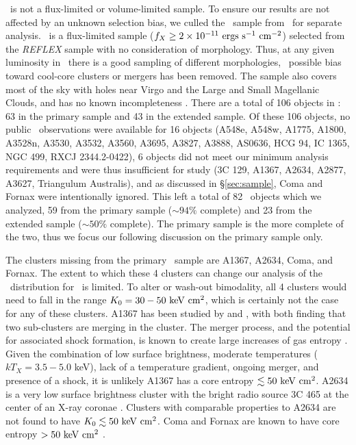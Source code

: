 \documentclass[12pt,preprint]{aastex}
\begin{document}
\accept\ is not a flux-limited or volume-limited sample. To ensure our
results are not affected by an unknown selection bias, we culled the
\hifl\ sample from \accept\ for separate analysis. \hifl\ is a
flux-limited sample ($f_X \ge 2 \times 10^{-11} \mathrm{\mbox{\ensuremath{\mathrm{~ergs}}} \mathrm{\mbox{\ensuremath{\mathrm{~s}}}^{-1}} \mbox{\ensuremath{\mathrm{~cm^{-2}}}}}$) selected from
the {\it{REFLEX}} sample \citep{reflex} with no consideration of
morphology. Thus, at any given luminosity in \hifl\ there is a good
sampling of different morphologies, \ie\ possible bias toward
cool-core clusters or mergers has been removed. The sample also covers
most of the sky with holes near Virgo and the Large and Small
Magellanic Clouds, and has no known incompleteness
\citep{2007A&A...466..805C}. There are a total of 106 objects in
\hifl: 63 in the primary sample and 43 in the extended sample. Of
these 106 objects, no public \chandra\ observations were available for
16 objects (A548e, A548w, A1775, A1800, A3528n, A3530, A3532, A3560,
A3695, A3827, A3888, AS0636, HCG 94, IC 1365, NGC 499, RXCJ
2344.2-0422), 6 objects did not meet our minimum analysis requirements
and were thus insufficient for study (3C 129, A1367, A2634, A2877,
A3627, Triangulum Australis), and as discussed in \S\ref{sec:sample},
Coma and Fornax were intentionally ignored. This left a total of 82
\hifl\ objects which we analyzed, 59 from the primary sample ($\sim
94\%$ complete) and 23 from the extended sample ($\sim 50\%$
complete). The primary sample is the more complete of the two, thus we
focus our following discussion on the primary sample only.

The clusters missing from the primary \hifl\ sample are A1367, A2634,
Coma, and Fornax. The extent to which these 4 clusters can change our
analysis of the \kna\ distribution for \hifl\ is limited.  To alter or
wash-out bimodality, all 4 clusters would need to fall in the range
$K_0 = 30-50 \mathrm{\mbox{\ensuremath{\mathrm{~keV}}} \mathrm{\mbox{\ensuremath{\mathrm{~cm}}}^2}}$, which is certainly not the case for any of these
clusters. A1367 has been studied by \citet{1998ApJ...500..138D} and
\citet{2002ApJ...576..708S}, with both finding that two sub-clusters
are merging in the cluster. The merger process, and the potential for
associated shock formation, is known to create large increases of gas
entropy \citep{2007MNRAS.376..497M}. Given the combination of low
surface brightness, moderate temperatures ($kT_X = 3.5-5.0$ keV), lack
of a temperature gradient, ongoing merger, and presence of a shock, it
is unlikely A1367 has a core entropy $\lesssim 50 \mathrm{\mbox{\ensuremath{\mathrm{~keV}}} \mathrm{\mbox{\ensuremath{\mathrm{~cm}}}^2}}$. A2634 is a very
low surface brightness cluster with the bright radio source 3C 465 at
the center of an X-ray coronae \citep{coronae}. Clusters with
comparable properties to A2634 are not found to have $K_0 \lesssim 50
\mathrm{\mbox{\ensuremath{\mathrm{~keV}}} \mathrm{\mbox{\ensuremath{\mathrm{~cm}}}^2}}$. Coma and Fornax are known to have core entropy $> 50 \mathrm{\mbox{\ensuremath{\mathrm{~keV}}} \mathrm{\mbox{\ensuremath{\mathrm{~cm}}}^2}}$
\citep{2008arXiv0802.1864R}.
\end{document}
